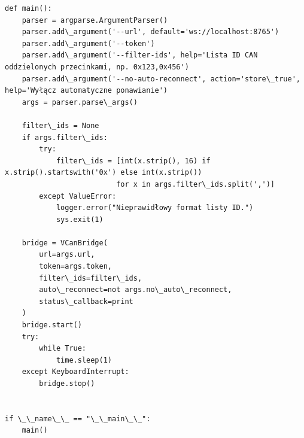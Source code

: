 \begin{lstlisting}
def main():
    parser = argparse.ArgumentParser()
    parser.add\_argument('--url', default='ws://localhost:8765')
    parser.add\_argument('--token')
    parser.add\_argument('--filter-ids', help='Lista ID CAN oddzielonych przecinkami, np. 0x123,0x456')
    parser.add\_argument('--no-auto-reconnect', action='store\_true', help='Wyłącz automatyczne ponawianie')
    args = parser.parse\_args()

    filter\_ids = None
    if args.filter\_ids:
        try:
            filter\_ids = [int(x.strip(), 16) if x.strip().startswith('0x') else int(x.strip())
                          for x in args.filter\_ids.split(',')]
        except ValueError:
            logger.error("Nieprawidłowy format listy ID.")
            sys.exit(1)

    bridge = VCanBridge(
        url=args.url,
        token=args.token,
        filter\_ids=filter\_ids,
        auto\_reconnect=not args.no\_auto\_reconnect,
        status\_callback=print
    )
    bridge.start()
    try:
        while True:
            time.sleep(1)
    except KeyboardInterrupt:
        bridge.stop()


if \_\_name\_\_ == "\_\_main\_\_":
    main()
\end{lstlisting}
